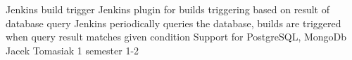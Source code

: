 \begin{project}
{Jenkins build trigger}
{Jenkins plugin for builds triggering based on result of database query} 
{ 
Jenkins periodically queries the database, builds are triggered when query result matches given condition
}
{Support for PostgreSQL, MongoDb}
{Jacek Tomasiak}
{1 semester}
{1-2}
\end{project}
